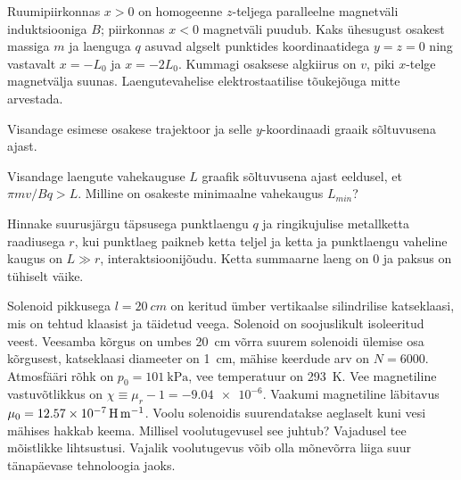 \documentclass[a4paper,11pt,twocolumn]{article}
\begin{document}
\begin{question}[E-S 2010, P6]
    Ruumipiirkonnas $x > 0$ on homogeenne $z$-teljega paralleelne magnetväli induktsiooniga $B$; piirkonnas $x < 0$ magnetväli puudub. Kaks ühesugust osakest massiga $m$ ja laenguga $q$ asuvad algselt punktides koordinaatidega $y = z = 0$ ning vastavalt $x = −L_0$ ja $x = −2L_0$. Kummagi osaksese algkiirus on $v$, piki $x$-telge magnetvälja suunas. Laengutevahelise elektrostaatilise tõukejõuga mitte arvestada.
    \begin{subquestion}
    \item Visandage esimese osakese trajektoor ja selle $y$-koordinaadi graaik sõltuvusena ajast.
    \item Visandage laengute vahekauguse $L$ graafik sõltuvusena ajast eeldusel, et \(\pi m v /Bq>L\). Milline on osakeste minimaalne vahekaugus $L_{min}$?
    \end{subquestion}
\end{question}

\begin{question}[PhysCup 2017, P1]
    Hinnake suurusjärgu täpsusega punktlaengu \(q\) ja ringikujulise metallketta raadiusega \(r\), kui punktlaeg paikneb ketta teljel ja ketta ja punktlaengu vaheline kaugus on \(L \gg r\), interaktsioonijõudu. Ketta summaarne laeng on \num{0} ja paksus on tühiselt väike.
\end{question}

\begin{question}[EuPhO 2018, T2][em5][1.7cm]
    Solenoid pikkusega \(l=\SI{20}{cm}\) on keritud ümber vertikaalse silindrilise katseklaasi, mis on tehtud klaasist ja täidetud veega. Solenoid on soojuslikult isoleeritud veest. Veesamba kõrgus on umbes \SI{20}{cm} võrra suurem solenoidi ülemise osa kõrgusest, katseklaasi diameeter on \SI{1}{cm}, mähise keerdude arv on \(N=\si{6000}\). Atmosfääri rõhk on \(p_0=\SI{101}{\kPa}\), vee temperatuur on \SI{293}{\K}. Vee magnetiline vastuvõtlikkus on \(\chi \equiv \mu_r - 1 = -\num{9.04e-6}\). Vaakumi magnetiline läbitavus \(\mu_0=\SI{12.57e-7}{\H\per\m}\). Voolu solenoidis suurendatakse aeglaselt kuni vesi mähises hakkab keema. Millisel voolutugevusel see juhtub? Vajadusel tee mõistlikke lihtsustusi. Vajalik voolutugevus võib olla mõnevõrra liiga suur tänapäevase tehnoloogia jaoks.
\end{question}
\end{document}

